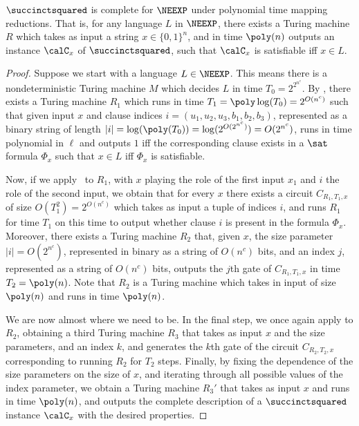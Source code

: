   
\begin{theorem}
  $\succinctsquared$ is complete for $\NEEXP$ under polynomial time
  mapping reductions. That is, for any language $L$ in $\NEEXP$,
  there exists a Turing machine $R$ which takes as input a string $x
  \in \{0,1\}^n$, and in time $\poly(n)$ outputs an instance $\calC_{x}$ of
  $\succinctsquared$, such that $\calC_{x}$ is satisfiable iff $x \in L$.
\end{theorem}
\begin{proof}
  Suppose we start with a language $L \in \NEEXP$. This means there is
  a nondeterministic Turing machine $M$ which decides $L$ in time
  $T_0 = 2^{2^{n^c}}$.
  By , there exists a Turing machine $R_1$
  which runs in time $T_1 = \poly\log(T_0) = 2^{O(n^c)}$ such that
  given input $x$ and clause indices $i = (u_1, u_2, u_3, b_1, b_2, b_3)$,
  represented as a binary string of length $|i| = \log(\poly(T_0)) =
  \log(2^{O(2^{n^c})}) = O(2^{n^c})$, runs in time polynomial in
  $\ell$ and outputs $1$ iff the corresponding clause exists in a
  $\sat$ formula  $\Phi_x$ such that $x \in L$ iff $\Phi_x$ is satisfiable. 

  Now, if we apply~ to $R_1$, with $x$ playing
  the role of the first input $x_1$ and $i$ the role of the second
  input, we obtain that for every $x$ there exists a circuit $C_{R_1, T_1,
    x}$ of size $O(T_1^2) = 2^{O(n^c)}$ which takes as input a tuple
  of indices $i$, and runs $R_1$ for time $T_1$ on this time to output
  whether clause $i$ is present in the formula $\Phi_x$. Moreover, there exists a
  Turing machine $R_2$ that, given $x$, the size parameter $|i| =
  O(2^{n^c})$, represented in binary as a string of $O(n^c)$ bits, and an index $j$, represented
  as a string of $O(n^c)$ bits, outputs
  the $j$th gate of $C_{R_1, T_1, x}$ in time $T_2 = \poly(n)$. Note that
  $R_2$ is a Turing machine which takes in input of size $\poly(n)$
  and runs in time $\poly(n)$.

  We are now almost where we need to be. In the final step, we once
  again apply  to $R_2$, obtaining a third Turing machine $R_3$
  that takes as input $x$ and the size parameters, and an index $k$,
  and generates the $k$th gate of the circuit $C_{R_2, T_2, x}$
  corresponding to running $R_2$ for $T_2$ steps. Finally, by
  fixing the dependence of the size parameters on the size of $x$, and
  iterating through all possible values of the index parameter, we
  obtain a Turing machine $R_3'$ that takes as input $x$ and runs in
  time $\poly(n)$, and outputs the complete description of a $\succinctsquared$ instance $\calC_x$
  with the desired properties.
\end{proof}

